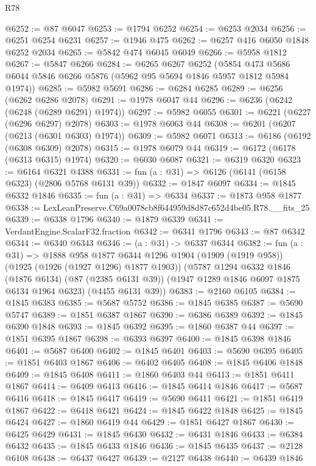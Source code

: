 \begin{lexlean}{R78}
\begin{coremodule}
@6252 := @87 @6047
@6253 := @1794 @6252
@6254 := @6253 @2034
@6256 := @6251 @6254 @6231
@6257 := @1946 @475
@6262 := @6257 @416 @6050 @1848 @6252 @2034
@6265 := @5842 @474 @6045 @6049
@6266 := @5958 @1812
@6267 := @5847 @6266
@6284 := @6265
    @6267
    @6252
    (@5854 @473 @5686 @6044 @5846 @6266 @5876 (@5962 @95 @5694 @1846 @5957 @1812 @5984 @1974))
@6285 := @5982 @5691
@6286 := @6284 @6285
@6289 := @6256 (@6262 @6286 @2078)
@6291 := @1978 @6047 @44
@6296 := @6236 (@6242 (@6248 (@6289 @6291) @1974))
@6297 := @5982 @6055
@6301 := @6221 (@6227 (@6296 @6297) @2078)
@6303 := @1978 @6063 @44
@6308 := @6201 (@6207 (@6213 (@6301 @6303) @1974))
@6309 := @5982 @6071
@6313 := @6186 (@6192 (@6308 @6309) @2078)
@6315 := @1978 @6079 @44
@6319 := @6172 (@6178 (@6313 @6315) @1974)
@6320 := @6030 @6087
@6321 := @6319 @6320
@6323 := @6164 @6321 @4388
@6331 := fun (a : @31) => @6126 (@6141 (@6158 @6323) (@2806 @5768 @6131 @39))
@6332 := @1847 @6097
@6334 := @1845 @6332 @1846
@6335 := fun (a : @31) => @6334
@6337 := @1873 @958 @1877
@6338 := LexLeanPreserve.C69a0078cb8f644959d8d87c652d4be05.R78.__fits_25
@6339 := @6338 @1796
@6340 := @1879 @6339
@6341 := VerdantEngine.ScalarF32.fraction
@6342 := @6341 @1796
@6343 := @87 @6342
@6344 := @6340 @6343
@6346 := (a : @31) -> @6337 @6344
@6382 := fun (a : @31) =>
  @1888
    @958
    @1877
    @6344
    @1296
    @1904
    (@1909 (@1919 @958))
    (@1925 (@1926 (@1927 @1296) @1877 @1903))
    (@5787
      @1294
      @6332
      @1846
      (@1876 @6134)
      (@87 (@2385 @6131 @39))
      (@1947 @1289 @1846 @6097 @1875 @6134 @1964 @6323)
      (@4455 @6131 @39))
@6383 := @2160 @6105
@6384 := @1845 @6383
@6385 := @5687 @5752
@6386 := @1845 @6385
@6387 := @5690 @5747
@6389 := @1851 @6387 @1867
@6390 := @6386 @6389
@6392 := @1845 @6390 @1848
@6393 := @1845 @6392
@6395 := @1860 @6387 @44
@6397 := @1851 @6395 @1867
@6398 := @6393 @6397
@6400 := @1845 @6398 @1846
@6401 := @5687 @6400
@6402 := @1845 @6401
@6403 := @5690 @6395
@6405 := @1851 @6403 @1867
@6406 := @6402 @6405
@6408 := @1845 @6406 @1848
@6409 := @1845 @6408
@6411 := @1860 @6403 @44
@6413 := @1851 @6411 @1867
@6414 := @6409 @6413
@6416 := @1845 @6414 @1846
@6417 := @5687 @6416
@6418 := @1845 @6417
@6419 := @5690 @6411
@6421 := @1851 @6419 @1867
@6422 := @6418 @6421
@6424 := @1845 @6422 @1848
@6425 := @1845 @6424
@6427 := @1860 @6419 @44
@6429 := @1851 @6427 @1867
@6430 := @6425 @6429
@6431 := @1845 @6430
@6432 := @6431 @1846
@6433 := @6384 @6432
@6435 := @1845 @6433 @1846
@6436 := @1845 @6435
@6437 := @2128 @6108
@6438 := @6437 @6427
@6439 := @2127 @6438
@6440 := @6439 @1846

\end{coremodule}
\end{lexlean}
